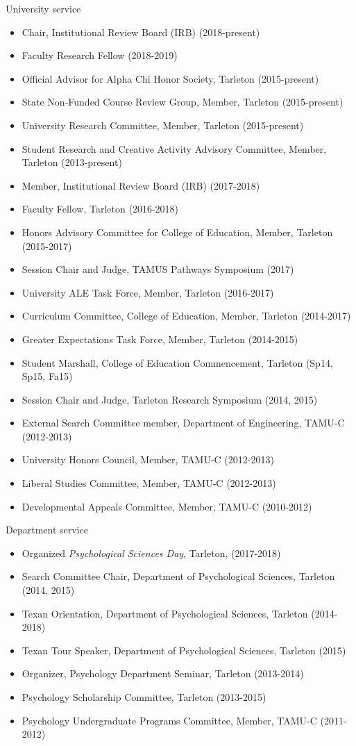 \documentclass[article,10pt]{article}
\begin{document}
University service

\begin{itemize}
\item Chair, Institutional Review Board (IRB) (2018-present)
\item Faculty Research Fellow (2018-2019)
\item Official Advisor for Alpha Chi Honor Society, Tarleton (2015-present)
\item State Non-Funded Course Review Group, Member, Tarleton (2015-present)
\item University Research Committee, Member, Tarleton (2015-present)
\item Student Research and Creative Activity Advisory Committee, Member, Tarleton (2013-present)
\item Member, Institutional Review Board (IRB) (2017-2018)
\item Faculty Fellow, Tarleton (2016-2018)
\item Honors Advisory Committee for College of Education, Member, Tarleton (2015-2017)
\item Session Chair and Judge, TAMUS Pathways Symposium (2017)
\item University ALE Task Force, Member, Tarleton (2016-2017)
\item Curriculum Committee, College of Education, Member, Tarleton (2014-2017)
\item Greater Expectations Task Force, Member, Tarleton (2014-2015)
\item Student Marshall, College of Education Commencement, Tarleton (Sp14, Sp15, Fa15)
\item Session Chair and Judge, Tarleton Research Symposium (2014, 2015)
\item External Search Committee member, Department of Engineering, TAMU-C (2012-2013)
\item University Honors Council, Member, TAMU-C (2012-2013)
\item Liberal Studies Committee, Member, TAMU-C (2012-2013)
\item Developmental Appeals Committee, Member, TAMU-C (2010-2012)
\end{itemize}

Department service

\begin{itemize}
\item Organized \emph{Psychological Sciences Day}, Tarleton, (2017-2018)
\item Search Committee Chair, Department of Psychological Sciences, Tarleton (2014, 2015)
\item Texan Orientation, Department of Psychological Sciences, Tarleton (2014-2018)
\item Texan Tour Speaker, Department of Psychological Sciences, Tarleton (2015)
\item Organizer, Psychology Department Seminar, Tarleton (2013-2014)
\item Psychology Scholarship Committee, Tarleton (2013-2015)
\item Psychology Undergraduate Programs Committee, Member, TAMU-C (2011-2012)
\end{itemize}
\end{document}
